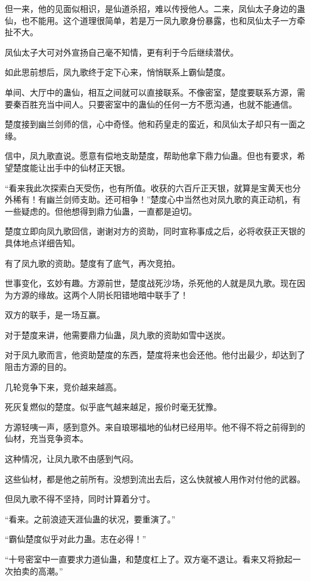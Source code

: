 \begin{this_body}
但一来，他的见面似相识，是仙道杀招，难以传授他人。二来，凤仙太子身边的蛊仙，也不能用。这个道理很简单，若是万一凤九歌身份暴露，也和凤仙太子一方牵扯不大。

凤仙太子大可对外宣扬自己毫不知情，更有利于今后继续潜伏。

如此思前想后，凤九歌终于定下心来，悄悄联系上霸仙楚度。

单间、大厅中的蛊仙，相互之间就可以直接联系。不像密室，楚度要联系方源，需要秦百胜充当中间人。只要密室中的蛊仙的任何一方不愿沟通，也就不能通信。

楚度接到幽兰剑师的信，心中奇怪。他和药皇走的蛮近，和凤仙太子却只有一面之缘。

信中，凤九歌直说。愿意有偿地支助楚度，帮助他拿下鼎力仙蛊。但也有要求，希望楚度能让出手中的仙材正天银。

“看来我此次探索白天受伤，也有所值。收获的六百斤正天银，就算是宝黄天也分外稀有！有幽兰剑师支助。还可相争！”楚度心中当然也对凤九歌的真正动机，有一些疑虑的。但他想得到鼎力仙蛊，一直都是迫切。

楚度立即向凤九歌回信，谢谢对方的资助，同时宣称事成之后，必将收获正天银的具体地点详细告知。

有了凤九歌的资助。楚度有了底气，再次竞拍。

世事变化，玄妙有趣。方源前世，楚度战死沙场，杀死他的人就是凤九歌。现在因为方源的缘故。这两个人阴长阳错地暗中联手了！

双方的联手，是一场互赢。

对于楚度来讲，他需要鼎力仙蛊，凤九歌的资助如雪中送炭。

对于凤九歌而言，他资助楚度的东西，楚度将来也会还他。他付出最少，却达到了阻击方源的目的。

几轮竞争下来，竞价越来越高。

死灰复燃似的楚度。似乎底气越来越足，报价时毫无犹豫。

方源轻咦一声，感到意外。来自琅琊福地的仙材已经用毕。他不得不将之前得到的仙材，充当竞争资本。

这种情况，让凤九歌不由感到气闷。

这些仙材，都是他之前所有。没想到流出去后，这么快就被人用作对付他的武器。

但凤九歌不得不坚持，同时计算着分寸。

“看来。之前浪迹天涯仙蛊的状况，要重演了。”

“霸仙楚度似乎对此力蛊。志在必得！”

“十号密室中一直要求力道仙蛊，和楚度杠上了。双方毫不退让。看来又将掀起一次拍卖的高潮。”


\end{this_body}
